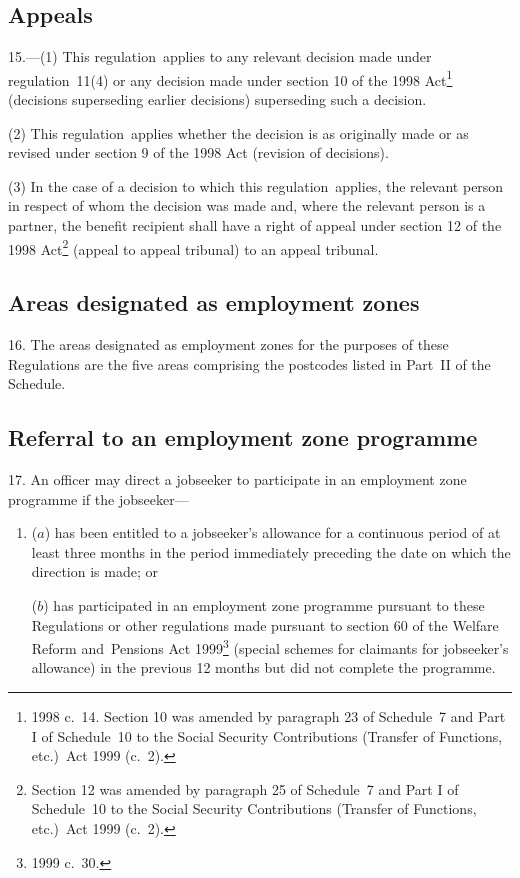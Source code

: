 \documentclass[12pt,a4paper]{article}
\begin{document}
\subsection[15. Appeals]{Appeals}

15.---(1)  This regulation~applies to any relevant decision made under regulation~11(4) or any decision made under section 10 of the 1998 Act\footnote{1998 c.~14. Section 10 was amended by paragraph 23 of Schedule~7 and Part I of Schedule~10 to the Social Security Contributions (Transfer of Functions, etc.)\ Act 1999 (c.~2).} (decisions superseding earlier decisions) superseding such a decision.

(2) This regulation~applies whether the decision is as originally made or as revised under section 9 of the 1998 Act (revision of decisions).

(3) In the case of a decision to which this regulation~applies, the relevant person in respect of whom the decision was made and, where the relevant person is a partner, the benefit recipient shall have a right of appeal under section 12 of the 1998 Act\footnote{Section 12 was amended by paragraph 25 of Schedule~7 and Part I of Schedule~10 to the Social Security Contributions (Transfer of Functions, etc.)\ Act 1999 (c.~2).} (appeal to appeal tribunal) to an appeal tribunal.

\subsection[16. Areas designated as employment zones]{Areas designated as employment zones}

16.  The areas designated as employment zones for the purposes of these Regulations are the five areas comprising the postcodes listed in Part~II of the Schedule.

\subsection[17. Referral to an employment zone programme]{Referral to an employment zone programme}

17.  An officer may direct a jobseeker to participate in an employment zone programme if the jobseeker—
\begin{enumerate}\item[]
($a$) has been entitled to a jobseeker’s allowance for a continuous period of at least three months in the period immediately preceding the date on which the direction is made; or

($b$) has participated in an employment zone programme pursuant to these Regulations or other regulations made pursuant to section 60 of the Welfare Reform and~Pensions Act 1999\footnote{1999 c.~30.} (special schemes for claimants for jobseeker’s allowance) in the previous 12 months but did not complete the programme.
\end{enumerate}
\end{document}
